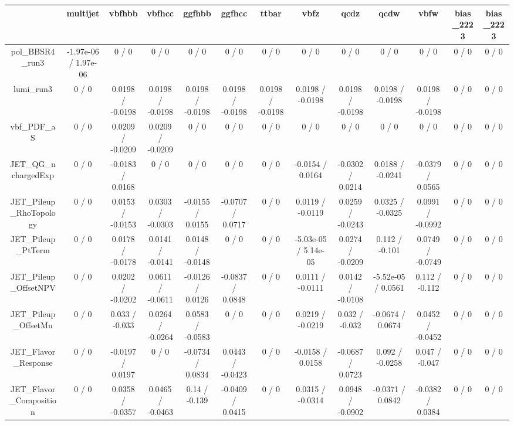 \documentclass[10pt]{article}
\begin{document}
\begin{table}[htbp]
\begin{center}
\begin{tabular}{|c|c|c|c|c|c|c|c|c|c|c|c|c|}
\hline 
      & multijet      & vbfhbb      & vbfhcc      & ggfhbb      & ggfhcc      & ttbar      & vbfz      & qcdz      & qcdw      & vbfw      & bias_2223      & bias_2223 \\ 
\hline 
  pol_BBSR4_run3 & -1.97e-06 / 1.97e-06 & 0 / 0 & 0 / 0 & 0 / 0 & 0 / 0 & 0 / 0 & 0 / 0 & 0 / 0 & 0 / 0 & 0 / 0 & 0 / 0 & 0 / 0 \\ 
  lumi_run3 & 0 / 0 & 0.0198 / -0.0198 & 0.0198 / -0.0198 & 0.0198 / -0.0198 & 0.0198 / -0.0198 & 0.0198 / -0.0198 & 0.0198 / -0.0198 & 0.0198 / -0.0198 & 0.0198 / -0.0198 & 0.0198 / -0.0198 & 0 / 0 & 0 / 0 \\ 
  vbf_PDF_aS & 0 / 0 & 0.0209 / -0.0209 & 0.0209 / -0.0209 & 0 / 0 & 0 / 0 & 0 / 0 & 0 / 0 & 0 / 0 & 0 / 0 & 0 / 0 & 0 / 0 & 0 / 0 \\ 
  JET_QG_nchargedExp & 0 / 0 & -0.0183 / 0.0168 & 0 / 0 & 0 / 0 & 0 / 0 & 0 / 0 & -0.0154 / 0.0164 & -0.0302 / 0.0214 & 0.0188 / -0.0241 & -0.0379 / 0.0565 & 0 / 0 & 0 / 0 \\ 
  JET_Pileup_RhoTopology & 0 / 0 & 0.0153 / -0.0153 & 0.0303 / -0.0303 & -0.0155 / 0.0155 & -0.0707 / 0.0717 & 0 / 0 & 0.0119 / -0.0119 & 0.0259 / -0.0243 & 0.0325 / -0.0325 & 0.0991 / -0.0992 & 0 / 0 & 0 / 0 \\ 
  JET_Pileup_PtTerm & 0 / 0 & 0.0178 / -0.0178 & 0.0141 / -0.0141 & 0.0148 / -0.0148 & 0 / 0 & 0 / 0 & -5.03e-05 / 5.14e-05 & 0.0274 / -0.0209 & 0.112 / -0.101 & 0.0749 / -0.0749 & 0 / 0 & 0 / 0 \\ 
  JET_Pileup_OffsetNPV & 0 / 0 & 0.0202 / -0.0202 & 0.0611 / -0.0611 & -0.0126 / 0.0126 & -0.0837 / 0.0848 & 0 / 0 & 0.0111 / -0.0111 & 0.0142 / -0.0108 & -5.52e-05 / 0.0561 & 0.112 / -0.112 & 0 / 0 & 0 / 0 \\ 
  JET_Pileup_OffsetMu & 0 / 0 & 0.033 / -0.033 & 0.0264 / -0.0264 & 0.0583 / -0.0583 & 0 / 0 & 0 / 0 & 0.0219 / -0.0219 & 0.032 / -0.032 & -0.0674 / 0.0674 & 0.0452 / -0.0452 & 0 / 0 & 0 / 0 \\ 
  JET_Flavor_Response & 0 / 0 & -0.0197 / 0.0197 & 0 / 0 & -0.0734 / 0.0834 & 0.0443 / -0.0423 & 0 / 0 & -0.0158 / 0.0158 & -0.0687 / 0.0723 & 0.092 / -0.0258 & 0.047 / -0.047 & 0 / 0 & 0 / 0 \\ 
  JET_Flavor_Composition & 0 / 0 & 0.0358 / -0.0357 & 0.0465 / -0.0463 & 0.14 / -0.139 & -0.0409 / 0.0415 & 0 / 0 & 0.0315 / -0.0314 & 0.0948 / -0.0902 & -0.0371 / 0.0842 & -0.0382 / 0.0384 & 0 / 0 & 0 / 0 \\ 

\end{tabular}
\end{center}
\end{table}
\end{document}
